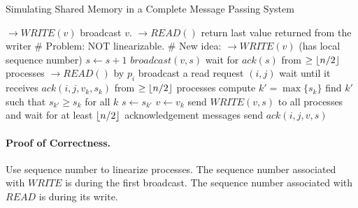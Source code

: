 \documentclass[twoside]{article}
\DeclarePairedDelimiter\floor{\lfloor}{\rfloor}
\begin{document}
\begin{algorithm}
	\caption{Simulating Shared Memory in a Complete Message Passing System}
    \label{pseudocode:multireader}
    \begin{algorithmic}[1]
	\State $\rightarrow WRITE(v)$
	\State broadcast $v$.
	\State $\rightarrow READ()$
	\State return last value returned from the writer
	\State \# Problem: NOT linearizable.
	\State
	\State \# New idea: 	
	\State $\rightarrow WRITE(v)$ (has local sequence number)
	\State $s \leftarrow s + 1$
	\State $broadcast(v,s)$
	\State wait for $ack(s)$ from $\geq \floor{n/2}$ processes
	\State $\rightarrow READ()$ by $p_i$
	\State broadcast a read request $(i,j)$
	\State wait until it receives $ack(i,j,v_k, s_k)$ from $\geq \floor{n/2}$ processes	
	\State compute $k' = \max\{s_k\}$
	\State find $k'$ such that $s_{k'} \geq s_k$ for all $k$
		\State $s \leftarrow s_{k'}$
		\State $v \leftarrow v_k$	
	\EndIf
	\State send $WRITE(v, s)$ to all processes and wait for at least $\floor{n/2}$ acknowledgement messages
		\State send $ack(i,j,v,s)$
	\EndIf
	\end{algorithmic}
\end{algorithm}

\paragraph{Proof of Correctness.} Use sequence number to linearize processes. The sequence number associated with $WRITE$ is during the first broadcast. The sequence number associated with $READ$ is during its write. 
\end{document}
